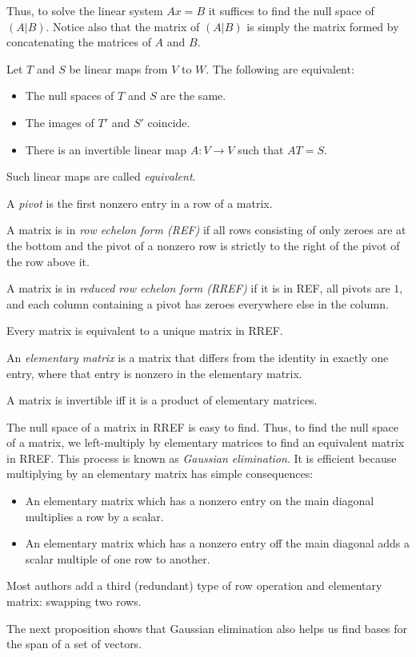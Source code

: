 \begin{rem}
  Thus, to solve the linear system $Ax=B$ it suffices to find the null space of
  $(A|B)$. Notice also that the matrix of $(A|B)$ is simply the matrix formed by
  concatenating the matrices of $A$ and $B$.
\end{rem}
\begin{prop}
  Let $T$ and $S$ be linear maps from $V$ to $W$. The following are equivalent:
  \begin{itemize}
    \item The null spaces of $T$ and $S$ are the same.
    \item The images of $T'$ and $S'$ coincide.
    \item There is an invertible linear map $A:V\to V$ such that $AT=S$.
  \end{itemize}
\end{prop}
\begin{defn}
  Such linear maps are called \emph{equivalent}.
\end{defn}
\begin{defn}
  A \emph{pivot} is the first nonzero entry in a row of a matrix.

  A matrix is in \emph{row echelon form (REF)} if all rows consisting
  of only zeroes are at the bottom and the pivot of a nonzero row is strictly to
  the right of the pivot of the row above it.

  A matrix is in \emph{reduced row echelon form (RREF)} if it is in REF, all
  pivots are $1$, and each column containing a pivot has zeroes everywhere else
  in the column.
\end{defn}
\begin{prop}
  Every matrix is equivalent to a unique matrix in RREF\@.
\end{prop}
\begin{defn}
  An \emph{elementary matrix} is a matrix that differs from the identity 
  in exactly one entry, where that entry is nonzero in the elementary matrix.
\end{defn}
\begin{prop}
  A matrix is invertible iff it is a product of elementary matrices.
\end{prop}
\begin{rem}
  The null space of a matrix in RREF is easy to find.
  Thus, to find the null space of a matrix, we left-multiply by elementary
  matrices to find an equivalent matrix in RREF\@. This process is known as
  \emph{Gaussian elimination}. It is efficient because
  multiplying by an elementary matrix has simple consequences:
  \begin{itemize}
    \item An elementary matrix which has a nonzero entry on the main diagonal
      multiplies a row by a scalar.
    \item An elementary matrix which has a nonzero entry off the main diagonal
      adds a scalar multiple of one row to another. 
  \end{itemize}
  Most authors add a third (redundant) type of row operation and elementary
  matrix: swapping two rows.

  The next proposition shows that Gaussian elimination also helps us find bases
  for the span of a set of vectors.
\end{rem}
